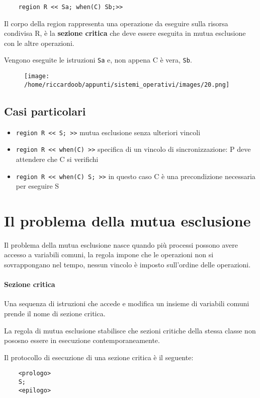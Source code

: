 \begin{lstlisting}
    region R << Sa; when(C) Sb;>>
\end{lstlisting}

Il corpo della region rappresenta una operazione da eseguire sulla risorsa condivisa R, è la \textbf{sezione critica} che deve essere eseguita in mutua esclusione con le altre operazioni.

Vengono eseguite le istruzioni \texttt{Sa} e, non appena C è vera, \texttt{Sb}.

\begin{figure}[H]
    \centering
    \texttt{[image: /home/riccardoob/appunti/sistemi\_operativi/images/20.png]}
\end{figure}

\subsection{Casi particolari}
\begin{itemize}
    \item \texttt{region R << S; >>} mutua esclusione senza ulteriori vincoli
    \item \texttt{region R << when(C) >>} specifica di un vincolo di sincronizzazione: P deve attendere che C si verifichi
    \item \texttt{region R << when(C) S; >>} in questo caso C è una precondizione necessaria per eseguire S
\end{itemize}

\section{Il problema della mutua esclusione}
Il problema della mutua esclusione nasce quando più processi possono avere accesso a variabili comuni, la regola impone che le operazioni non si sovrappongano nel tempo, nessun vincolo è imposto sull'ordine delle operazioni.

\paragraph{Sezione critica}
Una sequenza di istruzioni che accede e modifica un insieme di variabili comuni prende il nome di sezione critica.

La regola di mutua esclusione stabilisce che sezioni critiche della stessa classe non pososno essere in esecuzione contemporaneamente.

Il protocollo di esecuzione di una sezione critica è il seguente:
\begin{lstlisting}
    <prologo>
    S;
    <epilogo>
\end{lstlisting}

